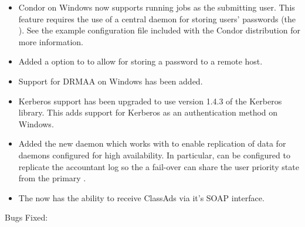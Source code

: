 \begin{itemize}
\item Condor on Windows now supports running jobs as the submitting
user. This feature requires the use of a central daemon for storing
users' passwords (the ). See the example configuration
file  included with the Condor
distribution for more information.

\item Added a  option to  to allow for
storing a password to a remote host.

\item Support for DRMAA on Windows has been added.

\item Kerberos support has been upgraded to use version 1.4.3 of the
Kerberos library.  This adds support for Kerberos as an authentication
method on Windows.

\item Added the new  daemon which works with
   to enable replication of data for daemons configured
  for high availability.  In particular,  can be
  configured to replicate the accountant log so the a fail-over
   can share the user priority state from the
  primary .

\item The  now has the ability to receive ClassAds
  via it's SOAP interface.

\end{itemize}

\noindent Bugs Fixed:

